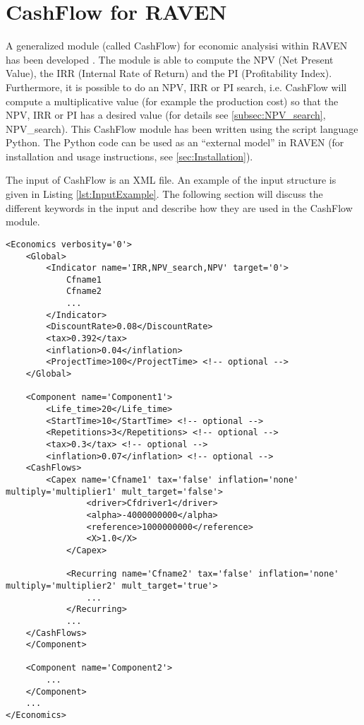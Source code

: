 \section{CashFlow for RAVEN}
A generalized module (called CashFlow) for economic analysisi within RAVEN has been developed \cite{MSApril2017}. The module is able to compute
the NPV (Net Present Value), the IRR (Internal Rate of Return) and the PI (Profitability Index). Furthermore, it is possible to
do an NPV, IRR or PI search, i.e. CashFlow will compute a multiplicative value (for example the production cost) so that the
NPV, IRR or PI has a desired value (for details see \ref{subsec:NPV_search}, NPV\_search). This CashFlow module has been written using the script language Python.
The Python code can be used as an “external model” in RAVEN (for installation and usage instructions, see \ref{sec:Installation}).

The input of CashFlow is an XML file. An example of the input structure is given in Listing \ref{lst:InputExample}. The following section will discuss the
 different keywords in the input and describe how they are used in the CashFlow module.

\begin{lstlisting}[style=XML,morekeywords={anAttribute},caption=Economics input example., label=lst:InputExample]
<Economics verbosity='0'>
    <Global>
        <Indicator name='IRR,NPV_search,NPV' target='0'>
            Cfname1
            Cfname2
            ...
        </Indicator>
        <DiscountRate>0.08</DiscountRate>
        <tax>0.392</tax>
        <inflation>0.04</inflation>
        <ProjectTime>100</ProjectTime> <!-- optional -->
    </Global>

    <Component name='Component1'>
        <Life_time>20</Life_time>
        <StartTime>10</StartTime> <!-- optional -->
        <Repetitions>3</Repetitions> <!-- optional -->
        <tax>0.3</tax> <!-- optional -->
        <inflation>0.07</inflation> <!-- optional -->
	<CashFlows>
	    <Capex name='Cfname1' tax='false' inflation='none' multiply='multiplier1' mult_target='false'>
    	        <driver>Cfdriver1</driver>
                <alpha>-4000000000</alpha>
                <reference>1000000000</reference>
                <X>1.0</X>
            </Capex>

            <Recurring name='Cfname2' tax='false' inflation='none' multiply='multiplier2' mult_target='true'>
                ...
            </Recurring>
            ...
	</CashFlows>
    </Component>

    <Component name='Component2'>
        ...
    </Component>
    ...
</Economics>
\end{lstlisting}

